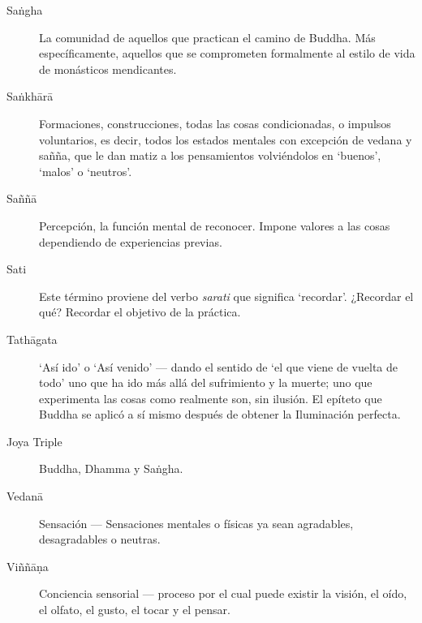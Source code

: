 \begin{description}
\item[Saṅgha] La comunidad de aquellos que practican el camino de Buddha.
  Más específicamente, aquellos que se comprometen formalmente al estilo de vida de monásticos mendicantes.

\item[Saṅkhārā] Formaciones, construcciones, todas las cosas condicionadas, o impulsos voluntarios, es decir, todos los estados mentales con excepción de vedana y sañña, que le dan matiz a los pensamientos volviéndolos en ‘buenos’, ‘malos’ o ‘neutros’.

\item[Saññā] Percepción, la función mental de reconocer. Impone valores a las cosas dependiendo de experiencias previas.

\item[Sati] Este término proviene del verbo \textit{sarati} que significa ‘recordar’. ¿Recordar el qué? Recordar el objetivo de la práctica. 

\item[Tathāgata] ‘Así ido’ o ‘Así venido’ --- dando el sentido de ‘el que viene de vuelta de todo’ uno que ha ido más allá del sufrimiento y la muerte; uno que experimenta las cosas como realmente son, sin ilusión. El epíteto que Buddha se aplicó a sí mismo después de obtener la Iluminación perfecta.

\item[Joya Triple] Buddha, Dhamma y Saṅgha.

\item[Vedanā] Sensación --- Sensaciones mentales o físicas ya sean agradables, desagradables o neutras.

\item[Viññāṇa] Conciencia sensorial --- proceso por el cual puede existir la visión, el oído, el olfato, el gusto, el tocar y el pensar.

\end{description}

